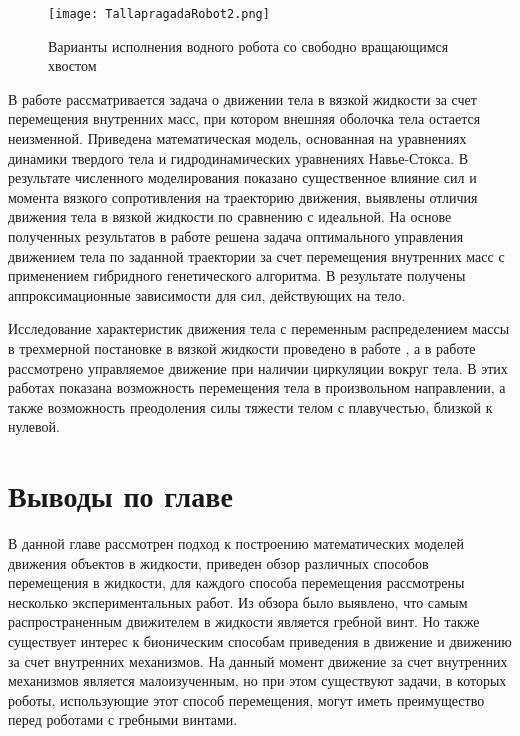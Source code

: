 \begin{figure}[h]
	\centering
	\texttt{[image: TallapragadaRobot2.png]}%
	\caption{Варианты исполнения водного робота со свободно вращающимся хвостом}
	\label{TallapragadaRobot2}
\end{figure}



В работе \cite{Ramodanov_Tenenev} рассматривается задача о движении тела в вязкой жидкости за счет перемещения внутренних масс, при котором внешняя оболочка тела остается неизменной. Приведена математическая модель, основанная на уравнениях динамики твердого тела и гидродинамических уравнениях Навье-Стокса. В результате численного моделирования показано существенное влияние сил и момента вязкого сопротивления на траекторию движения, выявлены отличия движения тела в вязкой жидкости по сравнению с идеальной. На основе полученных результатов в работе \cite{Vetchanin_Tenenev_2011} решена задача оптимального управления движением тела по заданной траектории за счет перемещения внутренних масс с применением гибридного генетического алгоритма. В результате получены аппроксимационные зависимости для сил, действующих на тело.

Исследование характеристик движения тела с переменным распределением массы в трехмерной постановке в вязкой жидкости проведено в работе \cite{Vetchanin_Mamaev_Tenenev_ND_2012}, а в работе \cite{Vetchanin_Kilin_2017} рассмотрено управляемое движение при наличии циркуляции вокруг тела. В этих работах показана возможность перемещения тела в произвольном направлении, а также возможность преодоления силы тяжести телом с плавучестью, близкой к нулевой.

\section{Выводы по главе}

В данной главе рассмотрен подход к построению математических моделей движения объектов в жидкости, приведен обзор различных способов перемещения в жидкости, для каждого способа перемещения рассмотрены несколько экспериментальных работ. Из обзора было выявлено, что самым распространенным движителем в жидкости является гребной винт. Но также существует интерес к бионическим способам приведения в движение и движению за счет внутренних механизмов. На данный момент движение за счет внутренних механизмов является малоизученным, но при этом существуют задачи, в которых роботы, использующие этот способ перемещения, могут иметь преимущество перед роботами с гребными винтами.

